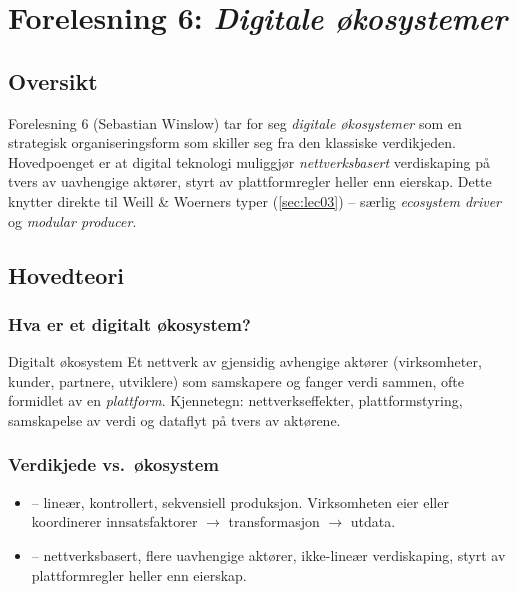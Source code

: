 \section{Forelesning 6: \emph{Digitale økosystemer}}
\label{sec:lec06}

\subsection*{Oversikt}
Forelesning 6 (Sebastian Winslow) tar for seg \emph{digitale økosystemer} som
en strategisk organiseringsform som skiller seg fra den klassiske verdikjeden.
Hovedpoenget er at digital teknologi muliggjør \emph{nettverksbasert} verdiskaping
på tvers av uavhengige aktører, styrt av plattformregler heller enn eierskap.
Dette knytter direkte til Weill \& Woerners typer (\autoref{sec:lec03}) --
særlig \emph{ecosystem driver} og \emph{modular producer}.

\subsection{Hovedteori}

\subsubsection*{Hva er et digitalt økosystem?}

\begin{definition}{Digitalt økosystem}
Et nettverk av gjensidig avhengige aktører (virksomheter, kunder, partnere,
utviklere) som samskapere og fanger verdi sammen, ofte formidlet av en
\emph{plattform}. Kjennetegn: nettverkseffekter, plattformstyring,
samskapelse av verdi og dataflyt på tvers av aktørene.
\end{definition}

\subsubsection*{Verdikjede vs.\ økosystem}
\begin{itemize}
  \item {} -- lineær, kontrollert, sekvensiell produksjon.
    Virksomheten eier eller koordinerer innsatsfaktorer $\rightarrow$
    transformasjon $\rightarrow$ utdata.
  \item {} -- nettverksbasert, flere uavhengige aktører,
    ikke-lineær verdiskaping, styrt av plattformregler heller enn eierskap.
\end{itemize}

